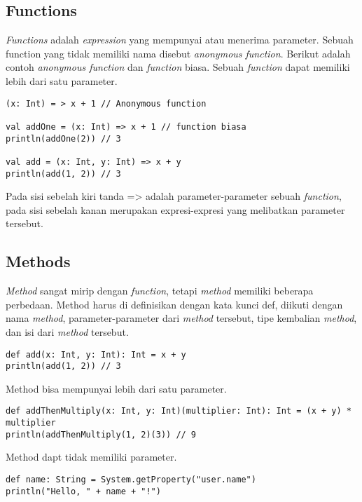 \subsection{Functions}

\textit{Functions} adalah \textit{expression} yang mempunyai atau menerima parameter. Sebuah function yang tidak memiliki nama disebut \textit{anonymous function}. Berikut adalah contoh \textit{anonymous function} dan \textit{function} biasa. Sebuah \textit{function} dapat memiliki lebih dari satu parameter.

\begin{verbatim}
(x: Int) = > x + 1 // Anonymous function 

val addOne = (x: Int) => x + 1 // function biasa 
println(addOne(2)) // 3 

val add = (x: Int, y: Int) => x + y 
println(add(1, 2)) // 3 
\end{verbatim}

Pada sisi sebelah kiri tanda => adalah parameter-parameter sebuah \textit{function}, pada sisi  sebelah kanan merupakan expresi-expresi yang melibatkan parameter tersebut. \\


\subsection{Methods}

\textit{Method} sangat mirip dengan \textit{function}, tetapi \textit{method} memiliki beberapa perbedaan. Method harus di definisikan dengan kata kunci def, diikuti dengan nama \textit{method}, parameter-parameter dari \textit{method} tersebut, tipe kembalian \textit{method}, dan isi dari \textit{method} tersebut. 

\begin{verbatim}
def add(x: Int, y: Int): Int = x + y 
println(add(1, 2)) // 3 
\end{verbatim}

Method bisa mempunyai lebih dari satu parameter. 

\begin{verbatim}
def addThenMultiply(x: Int, y: Int)(multiplier: Int): Int = (x + y) * multiplier 
println(addThenMultiply(1, 2)(3)) // 9 
\end{verbatim}


Method dapt tidak memiliki parameter.

\begin{verbatim}
def name: String = System.getProperty("user.name")
println("Hello, " + name + "!")
\end{verbatim}

